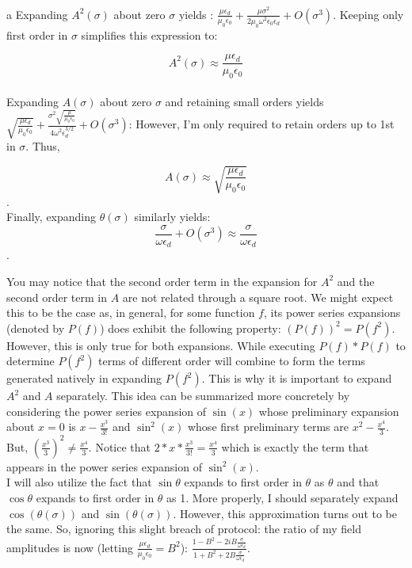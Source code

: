 \begin{homeworkProblem}
\begin{homeworkSection}{a}
Expanding $A^2(\sigma)$ about zero $\sigma$ yields : $\frac{\mu  \epsilon _d}{\mu _0 \epsilon _0}+\frac{\mu  \sigma ^2}{2 \mu _0 \omega ^2 \epsilon _0 \epsilon
   _d}+O\left(\sigma ^3\right)$. Keeping only first order in $\sigma$ simplifies this expression to:
	
	\[ A^2(\sigma) \approx \frac{\mu \epsilon_d}{\mu_0 \epsilon_0} \]
\\

Expanding $A(\sigma)$ about zero $\sigma$ and retaining small orders yields $\sqrt{\frac{\mu  \epsilon _d}{\mu _0 \epsilon _0}}+\frac{\sigma ^2 \sqrt{\frac{\mu }{\mu _0 \epsilon _0}}}{4 \omega ^2
   \epsilon _d^{3/2}}+O\left(\sigma ^3\right)$: However, I'm only required to retain orders up to 1st in $\sigma$. Thus, 
	
	\[ A(\sigma) \approx \sqrt{\frac{\mu  \epsilon_{d}}{\mu _0 \epsilon _0}} \].
	\\
		
Finally, expanding $\theta(\sigma)$ similarly yields: \[\frac{\sigma }{\omega \epsilon_{d}}+O\left(\sigma ^3\right)\approx \frac{\sigma}{\omega \epsilon_{d}} \].

	You may notice that the second order term in the expansion for $A^2$ and the second order term in $A$ are not related through a square root. We might expect this to be the case as, in general, for some function $f$, its power series expansions (denoted by $P(f)$) does exhibit the following property: $(P(f))^2 =P(f^2)$. However, this is only true for both expansions. While executing $P(f)*P(f)$ to determine $P(f^2)$ terms of different order will combine to form the terms generated natively in expanding $P(f^2)$. This is why it is important to expand $A^2$ and $A$ separately. This idea can be summarized more concretely by considering the power series expansion of $\sin(x)$ whose preliminary expansion about $x=0$ is $x-\frac{x^3}{3!}$ and $\sin^2(x)$ whose first preliminary terms are $x^2-\frac{x^4}{3}$. But, $(\frac{x^3}{3})^2 \ne \frac{x^4}{3}$. Notice that $2*x*\frac{x^3}{3!} = \frac{x^4}{3}$ which is exactly the term that appears in the power series expansion of $\sin^2(x)$.
	\\

I will also utilize the fact that $\sin\theta$ expands to first order in $\theta$ as $\theta$ and that $\cos\theta$ expands to first order in $\theta$ as 1. More properly, I should separately expand $\cos(\theta(\sigma))$ and $\sin(\theta(\sigma))$. However, this approximation turns out to be the same. So, ignoring this slight breach of protocol: the ratio of my field amplitudes is now (letting $\frac{\mu\epsilon_d}{\mu_0 \epsilon_0} = B^2$): $\frac{1 - B^2 - 2i B \frac{\sigma}{\omega \epsilon_d}}{1 + B^2 + 2 B \frac{\sigma}{\omega \epsilon_d}}$.
\\


\end{homeworkSection}
\end{homeworkProblem}
